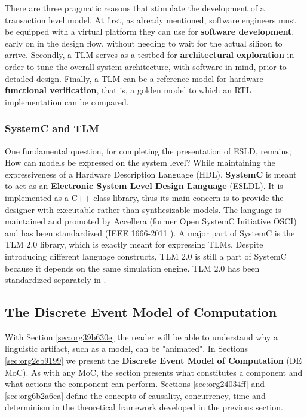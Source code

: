 \documentclass[11pt]{article}
\begin{document}
There are three pragmatic reasons that stimulate the development of a transaction level model.
At first, as already mentioned, software engineers must be equipped with a virtual platform they can use for \textbf{software development}, early on in the design flow, without needing to wait for the actual silicon to arrive.
Secondly, a TLM serves as a testbed for \textbf{architectural exploration} in order to tune the overall system architecture, with software in mind, prior to detailed design.
Finally, a TLM can be a reference model for hardware \textbf{functional verification}, that is, a golden model to which an RTL implementation can be compared.




\subsubsection{SystemC and TLM}
\label{sec:org49bb996}
One fundamental question, for completing the presentation of ESLD, remains; How can models be expressed on the system level?
While maintaining the expressiveness of a Hardware Description Language (HDL), \textbf{SystemC} is meant to act as an \textbf{Electronic System Level Design Language} (ESLDL).
It is implemented as a C++ class library, thus its main concern is to provide the designer with executable rather than synthesizable models.
The language is maintained and promoted by Accellera (former Open SystemC Initiative OSCI) and has been standardized (IEEE 1666-2011 \cite{OpenSystemCInitiative2012}).
A major part of SystemC is the TLM 2.0 library, which is exactly meant for expressing TLMs.
Despite introducing different language constructs, TLM 2.0 is still a part of SystemC because it depends on the same simulation engine.
TLM 2.0 has been standardized separately in \cite{OpenSystemCInitiative2009}.
\clearpage

\subsection{The Discrete Event Model of Computation}
\label{sec:orgc4081ce}
With Section \ref{sec:org39b630e} the reader will be able to understand why a linguistic artifact, such as a model, can be "animated".
In Sections \ref{sec:org2eb9199} we present the \textbf{Discrete Event Model of Computation} (DE MoC).
As with any MoC, the section presents what constitutes a component and what actions the component can perform.
Sections \ref{sec:org24034ff} and \ref{sec:org6b2a6ea} define the concepts of causality, concurrency, time and determinism in the theoretical framework developed in the previous section.
\end{document}
